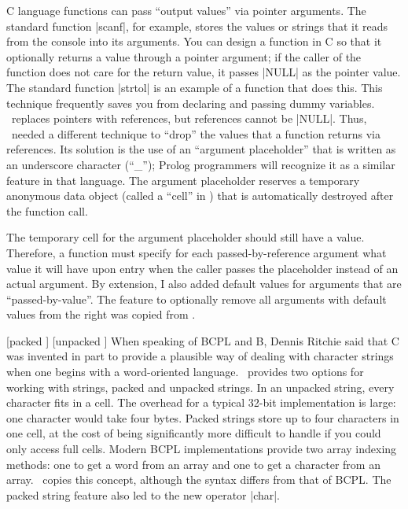 {{C language functions can pass ``output values'' via pointer arguments. The
standard function |scanf|, for example, stores the values or strings that it
reads from the console into its arguments. You can design a function in C so
that it optionally returns a value through a pointer argument; if the caller
of the function does not care for the return value, it passes |NULL| as the
pointer value. The standard function |strtol| is an example of a function that
does this. This technique frequently saves you from declaring and passing
dummy variables. \Small\ replaces pointers with references, but references
cannot be |NULL|. Thus, \Small\ needed a different technique to ``drop'' the
values that a function returns via references. Its solution is the use of an
``argument placeholder'' that is written as an underscore character (``_'');
Prolog programmers will recognize it as a similar feature in that language.
The argument placeholder reserves a temporary anonymous data object (called a
``cell'' in \Small) that is automatically destroyed after the function call.

The temporary cell for the argument placeholder should still have a value.
Therefore, a function must specify for each passed-by-reference argument what
value it will have upon entry when the caller passes the placeholder instead
of an actual argument. By extension, I also added default values for arguments
that are ``passed-by-value''. The feature to optionally remove all arguments
with default values from the right was copied from \Cpp.

  [packed \midtilde]
[unpacked \midtilde] 
When speaking of BCPL and B, Dennis Ritchie said that C was invented in part
to provide a plausible way of dealing with character strings when one begins
with a word-oriented language. \Small\ provides two options for working with
strings, packed and unpacked strings. In an unpacked string, every character fits
in a cell. The overhead for a typical 32-bit implementation is large:
one character would take four bytes. Packed strings store up to four
characters in one cell, at the cost of being significantly more difficult to
handle if you could only access full cells. Modern BCPL implementations
provide two array indexing methods: one to get a word from an array and one to
get a character from an array. \Small\ copies this concept, although the syntax
differs from that of BCPL. The packed string feature also led to the new
operator |char|.

}}
